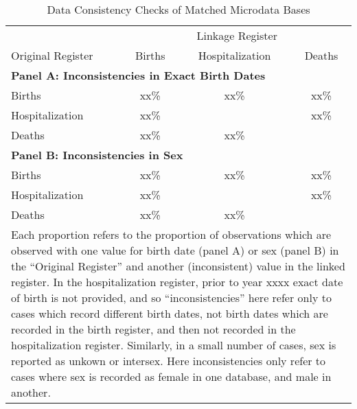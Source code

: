 \documentclass[11pt]{article}
\begin{document}
\begin{appendices}
    \begin{table}[htpb!]
    \centering
    \caption{Data Consistency Checks of Matched Microdata Bases}  
    \begin{tabular}{lccc} \toprule
               & \multicolumn{3}{c}{Linkage Register} \\ \cmidrule(r){2-4}  
      Original Register & Births & Hospitalization & Deaths \\ \midrule
      \multicolumn{4}{l}{\textbf{Panel A: Inconsistencies in Exact Birth Dates}} \\
      Births          & xx\% & xx\% & xx\% \\
      Hospitalization \hspace{2cm} & xx\% &      & xx\% \\
      Deaths          & xx\% & xx\% &      \\
      \multicolumn{4}{l}{\textbf{Panel B: Inconsistencies in Sex}} \\
      Births          & xx\% & xx\% & xx\% \\
      Hospitalization & xx\% &      & xx\% \\
      Deaths          & xx\% & xx\% &      \\ \bottomrule
      \multicolumn{4}{p{10.2cm}}{\footnotesize Each proportion refers to
        the proportion of observations which are observed with one value
        for birth date (panel A) or sex (panel B) in the ``Original Register''
        and another (inconsistent) value in the linked register. In the
        hospitalization register, prior to year xxxx exact date of birth
        is not provided, and so ``inconsistencies'' here refer only to cases
        which record different birth dates, not birth dates which are recorded
        in the birth register, and then not recorded in the hospitalization
        register.  Similarly, in a small number of cases, sex is reported
        as unkown or intersex.  Here inconsistencies only refer to cases where
        sex is recorded as female in one database, and male in another.} \\
    \end{tabular}
  \end{table}


\end{appendices}
\end{document}
